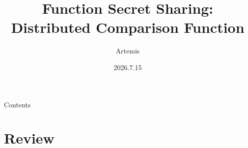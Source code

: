 \documentclass[aspectratio=169,11pt]{beamer}
\title{Function Secret Sharing:\\[-1mm]Distributed Comparison Function}
\author{Artemis}
\date{2026.7.15}
\begin{document}
\begin{frame}
  \titlepage
\end{frame}

\begin{frame}[t]{Contents}
  \begin{MyPreContent}[top][left]
    \MyPreTOC
  \end{MyPreContent}
\end{frame}


\section{Review}

\end{document}
